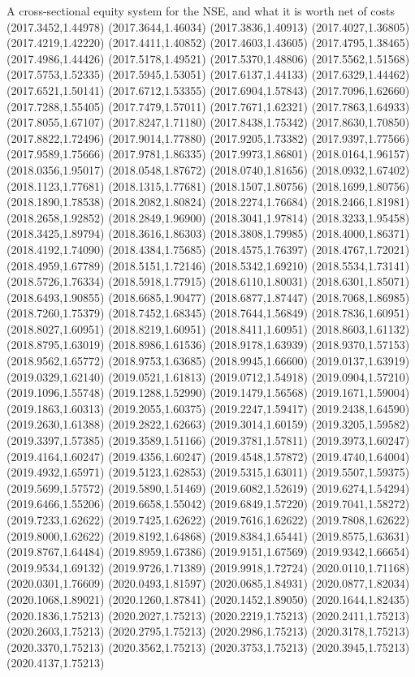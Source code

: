 \documentclass[aspectratio=169,10pt]{beamer}
\begin{document}
\begin{frame}[t]{A cross-sectional equity system for the NSE, and what it is worth net of costs}
(2017.3452,1.44978) (2017.3644,1.46034) (2017.3836,1.40913) (2017.4027,1.36805) (2017.4219,1.42220) (2017.4411,1.40852) (2017.4603,1.43605) (2017.4795,1.38465) (2017.4986,1.44426) (2017.5178,1.49521) (2017.5370,1.48806) (2017.5562,1.51568) (2017.5753,1.52335) (2017.5945,1.53051) (2017.6137,1.44133) (2017.6329,1.44462) (2017.6521,1.50141) (2017.6712,1.53355) (2017.6904,1.57843) (2017.7096,1.62660) (2017.7288,1.55405) (2017.7479,1.57011) (2017.7671,1.62321) (2017.7863,1.64933) (2017.8055,1.67107) (2017.8247,1.71180) (2017.8438,1.75342) (2017.8630,1.70850) (2017.8822,1.72496) (2017.9014,1.77880) (2017.9205,1.73382) (2017.9397,1.77566) (2017.9589,1.75666) (2017.9781,1.86335) (2017.9973,1.86801) (2018.0164,1.96157) (2018.0356,1.95017) (2018.0548,1.87672) (2018.0740,1.81656) (2018.0932,1.67402) (2018.1123,1.77681) (2018.1315,1.77681) (2018.1507,1.80756) (2018.1699,1.80756) (2018.1890,1.78538) (2018.2082,1.80824) (2018.2274,1.76684) (2018.2466,1.81981) (2018.2658,1.92852) (2018.2849,1.96900) (2018.3041,1.97814) (2018.3233,1.95458) (2018.3425,1.89794) (2018.3616,1.86303) (2018.3808,1.79985) (2018.4000,1.86371) (2018.4192,1.74090) (2018.4384,1.75685) (2018.4575,1.76397) (2018.4767,1.72021) (2018.4959,1.67789) (2018.5151,1.72146) (2018.5342,1.69210) (2018.5534,1.73141) (2018.5726,1.76334) (2018.5918,1.77915) (2018.6110,1.80031) (2018.6301,1.85071) (2018.6493,1.90855) (2018.6685,1.90477) (2018.6877,1.87447) (2018.7068,1.86985) (2018.7260,1.75379) (2018.7452,1.68345) (2018.7644,1.56849) (2018.7836,1.60951) (2018.8027,1.60951) (2018.8219,1.60951) (2018.8411,1.60951) (2018.8603,1.61132) (2018.8795,1.63019) (2018.8986,1.61536) (2018.9178,1.63939) (2018.9370,1.57153) (2018.9562,1.65772) (2018.9753,1.63685) (2018.9945,1.66600) (2019.0137,1.63919) (2019.0329,1.62140) (2019.0521,1.61813) (2019.0712,1.54918) (2019.0904,1.57210) (2019.1096,1.55748) (2019.1288,1.52990) (2019.1479,1.56568) (2019.1671,1.59004) (2019.1863,1.60313) (2019.2055,1.60375) (2019.2247,1.59417) (2019.2438,1.64590) (2019.2630,1.61388) (2019.2822,1.62663) (2019.3014,1.60159) (2019.3205,1.59582) (2019.3397,1.57385) (2019.3589,1.51166) (2019.3781,1.57811) (2019.3973,1.60247) (2019.4164,1.60247) (2019.4356,1.60247) (2019.4548,1.57872) (2019.4740,1.64004) (2019.4932,1.65971) (2019.5123,1.62853) (2019.5315,1.63011) (2019.5507,1.59375) (2019.5699,1.57572) (2019.5890,1.51469) (2019.6082,1.52619) (2019.6274,1.54294) (2019.6466,1.55206) (2019.6658,1.55042) (2019.6849,1.57220) (2019.7041,1.58272) (2019.7233,1.62622) (2019.7425,1.62622) (2019.7616,1.62622) (2019.7808,1.62622) (2019.8000,1.62622) (2019.8192,1.64868) (2019.8384,1.65441) (2019.8575,1.63631) (2019.8767,1.64484) (2019.8959,1.67386) (2019.9151,1.67569) (2019.9342,1.66654) (2019.9534,1.69132) (2019.9726,1.71389) (2019.9918,1.72724) (2020.0110,1.71168) (2020.0301,1.76609) (2020.0493,1.81597) (2020.0685,1.84931) (2020.0877,1.82034) (2020.1068,1.89021) (2020.1260,1.87841) (2020.1452,1.89050) (2020.1644,1.82435) (2020.1836,1.75213) (2020.2027,1.75213) (2020.2219,1.75213) (2020.2411,1.75213) (2020.2603,1.75213) (2020.2795,1.75213) (2020.2986,1.75213) (2020.3178,1.75213) (2020.3370,1.75213) (2020.3562,1.75213) (2020.3753,1.75213) (2020.3945,1.75213) (2020.4137,1.75213) 
\end{frame}
\end{document}
